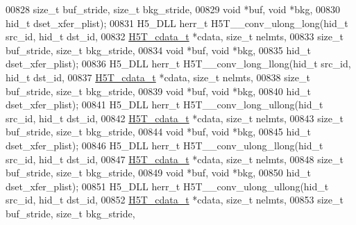 \begin{DoxyCode}
00828                    \textcolor{keywordtype}{size\_t} buf\_stride, \textcolor{keywordtype}{size\_t} bkg\_stride,
00829                                    \textcolor{keywordtype}{void} *buf, \textcolor{keywordtype}{void} *bkg,
00830                                    hid\_t dset\_xfer\_plist);
00831 H5\_DLL herr\_t H5T\_\_conv\_ulong\_long(hid\_t src\_id, hid\_t dst\_id,
00832                    \hyperlink{struct_h5_t__cdata__t}{H5T\_cdata\_t} *cdata, \textcolor{keywordtype}{size\_t} nelmts,
00833                    \textcolor{keywordtype}{size\_t} buf\_stride, \textcolor{keywordtype}{size\_t} bkg\_stride,
00834                                    \textcolor{keywordtype}{void} *buf, \textcolor{keywordtype}{void} *bkg,
00835                                    hid\_t dset\_xfer\_plist);
00836 H5\_DLL herr\_t H5T\_\_conv\_long\_llong(hid\_t src\_id, hid\_t dst\_id,
00837                    \hyperlink{struct_h5_t__cdata__t}{H5T\_cdata\_t} *cdata, \textcolor{keywordtype}{size\_t} nelmts,
00838                    \textcolor{keywordtype}{size\_t} buf\_stride, \textcolor{keywordtype}{size\_t} bkg\_stride,
00839                                    \textcolor{keywordtype}{void} *buf, \textcolor{keywordtype}{void} *bkg,
00840                                    hid\_t dset\_xfer\_plist);
00841 H5\_DLL herr\_t H5T\_\_conv\_long\_ullong(hid\_t src\_id, hid\_t dst\_id,
00842                     \hyperlink{struct_h5_t__cdata__t}{H5T\_cdata\_t} *cdata, \textcolor{keywordtype}{size\_t} nelmts,
00843                     \textcolor{keywordtype}{size\_t} buf\_stride, \textcolor{keywordtype}{size\_t} bkg\_stride,
00844                                     \textcolor{keywordtype}{void} *buf, \textcolor{keywordtype}{void} *bkg,
00845                                     hid\_t dset\_xfer\_plist);
00846 H5\_DLL herr\_t H5T\_\_conv\_ulong\_llong(hid\_t src\_id, hid\_t dst\_id,
00847                     \hyperlink{struct_h5_t__cdata__t}{H5T\_cdata\_t} *cdata, \textcolor{keywordtype}{size\_t} nelmts,
00848                     \textcolor{keywordtype}{size\_t} buf\_stride, \textcolor{keywordtype}{size\_t} bkg\_stride,
00849                                     \textcolor{keywordtype}{void} *buf, \textcolor{keywordtype}{void} *bkg,
00850                                     hid\_t dset\_xfer\_plist);
00851 H5\_DLL herr\_t H5T\_\_conv\_ulong\_ullong(hid\_t src\_id, hid\_t dst\_id,
00852                      \hyperlink{struct_h5_t__cdata__t}{H5T\_cdata\_t} *cdata, \textcolor{keywordtype}{size\_t} nelmts,
00853                      \textcolor{keywordtype}{size\_t} buf\_stride, \textcolor{keywordtype}{size\_t} bkg\_stride,

\end{DoxyCode}
